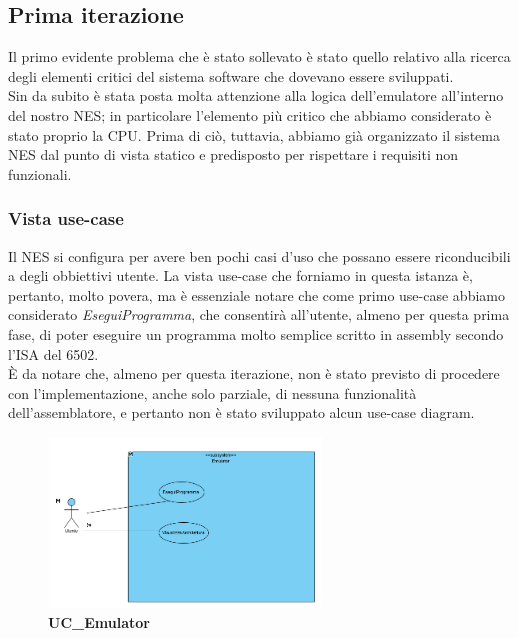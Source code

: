 \documentclass[11pt]{article}
\begin{document}
\subsection{Prima iterazione}
Il primo evidente problema che è stato sollevato è stato quello relativo alla ricerca degli elementi critici del sistema software che dovevano essere sviluppati.\\
Sin da subito è stata posta molta attenzione alla logica dell'emulatore all'interno del nostro NES; in particolare l'elemento più critico che abbiamo considerato è stato proprio la CPU. Prima di ciò, tuttavia, abbiamo già organizzato il sistema NES dal punto di vista statico e predisposto per rispettare i requisiti non funzionali.
\subsubsection{Vista use-case}
Il NES si configura per avere ben pochi casi d'uso che possano essere riconducibili a degli obbiettivi utente. La vista use-case che forniamo in questa istanza è, pertanto, molto povera, ma è essenziale notare che come primo use-case abbiamo considerato \emph{EseguiProgramma}, che consentirà all'utente, almeno per questa prima fase, di poter eseguire un programma molto semplice scritto in assembly secondo l'ISA del 6502.\\
È da notare che, almeno per questa iterazione, non è stato previsto di procedere con l'implementazione, anche solo parziale, di nessuna funzionalità dell'assemblatore, e pertanto non è stato sviluppato alcun use-case diagram.
\clearpage
\begin{figure}[h]
\centering
\includegraphics[width=275px, height=171px]{UC_Emulator.png}\\
\small\textbf{UC\_Emulator}
\end{figure}
\end{document}
